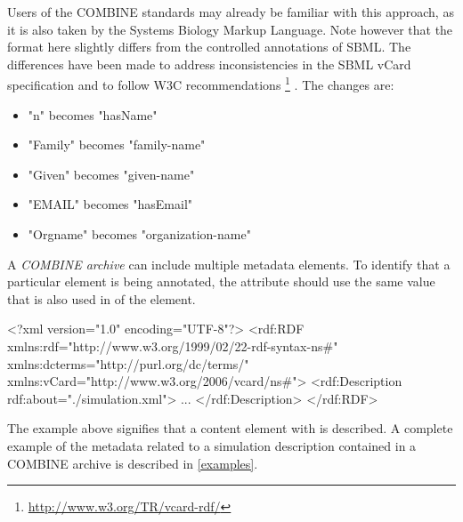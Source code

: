 Users of the COMBINE standards may already be familiar with this 
approach, as it is also taken by the Systems Biology Markup Language. 
Note however that the format here slightly differs from the controlled 
annotations of SBML. The differences have been made to address inconsistencies 
in the SBML vCard specification and to follow W3C recommendations {\footnote[4]{\url{http://www.w3.org/TR/vcard-rdf/}}} . The changes 
are:

\begin{itemize}
	\item  "n" becomes "hasName" 
	\item  "Family" becomes "family-name" 
	\item  "Given" becomes "given-name" 
	\item  "EMAIL" becomes "hasEmail" 
	\item  "Orgname" becomes "organization-name" 
\end{itemize}

A \textit{COMBINE archive} can include multiple metadata elements. To 
identify that a particular \Content element is being annotated, the 
 attribute should use the same value that is also used 
in  of the \Content element. 


\begin{example}
<?xml version="1.0" encoding="UTF-8"?>
<rdf:RDF xmlns:rdf="http://www.w3.org/1999/02/22-rdf-syntax-ns#" 
         xmlns:dcterms="http://purl.org/dc/terms/" 
				 xmlns:vCard="http://www.w3.org/2006/vcard/ns#">
   <rdf:Description rdf:about="./simulation.xml">
   ...
	 </rdf:Description>
</rdf:RDF>
\end{example}

The example above signifies that a content element with 
 is described. A complete example of 
the metadata related to a simulation description contained in a COMBINE 
archive is described in \ref{examples}. 


